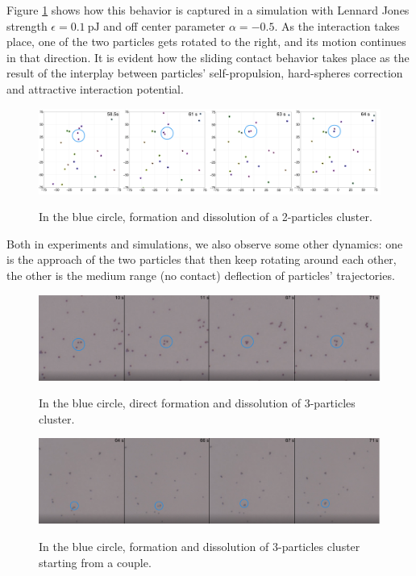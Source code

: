 \documentclass[../../master_thesis_np.tex]{subfiles}
\begin{document}
	Figure \ref{fig:simdoub} shows how this behavior is captured in a simulation with Lennard Jones strength $\epsilon = \SI{0.1}{\pico\joule}$ and off center parameter $\alpha = -0.5$.
	As the interaction takes place, one of the two particles gets rotated to the right, and its motion continues in that direction.
	It is evident how the sliding contact behavior takes place as the result of the interplay between particles' self-propulsion, hard-spheres correction and attractive interaction potential.
	\begin{figure}[hbtp]
		\centering
		\includegraphics[width = \textwidth]{qual/simdoub.png}
		\label{fig:simdoub}
		\caption{In the blue circle, formation and dissolution of a 2-particles cluster.}
	\end{figure}
	
	Both in experiments and simulations, we also observe some other dynamics: one is the approach of the two particles that then keep rotating around each other, the other is the medium range (no contact) deflection of particles' trajectories.
	
	\begin{figure}[hbtp]
		\centering
		\includegraphics[width = \textwidth]{qual/trip17.png}
		\label{fig:trip17}
		\caption{In the blue circle, direct formation and dissolution of 3-particles cluster.}
	\end{figure}
	
	\begin{figure}[hbtp]
		\centering
		\includegraphics[width = \textwidth]{qual/trip9.png}
		\label{fig:trip9}
		\caption{In the blue circle, formation and dissolution of 3-particles cluster starting from a couple.}
	\end{figure}
	
\end{document}
